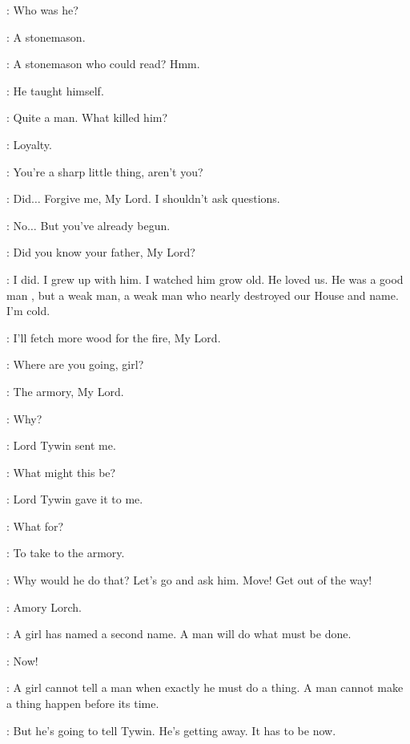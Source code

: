 \TYWIN: Who was he? 

\ARYA: A stonemason. 

\TYWIN: A stonemason who could read? Hmm. 

\ARYA: He taught himself. 

\TYWIN: Quite a man. What killed him? 

\ARYA: Loyalty. 

\TYWIN: You're a sharp little thing, aren't you? 

\ARYA: Did$\ldots$ Forgive me, My Lord. I shouldn't ask questions. 

\TYWIN: No$\ldots$ But you've already begun. 

\ARYA: Did you know your father, My Lord? 

\TYWIN: I did. I grew up with him. I watched him grow old. He loved us. He was a good man , but a weak man, a weak man who nearly destroyed our House and name. I'm cold. 

\ARYA: I'll fetch more wood for the fire, My Lord. 


\AMORY: Where are you going, girl? 

\ARYA: The armory, My Lord. 

\AMORY: Why? 

\ARYA: Lord Tywin sent me. 


\AMORY: What might this be? 

\ARYA: Lord Tywin gave it to me. 

\AMORY: What for? 

\ARYA: To take to the armory. 

\AMORY: Why would he do that? Let's go and ask him.   Move! Get out of the way! 


\ARYA: Amory Lorch. 

\JAQEN: A girl has named a second name. A man will do what must be done. 

\ARYA: Now! 

\JAQEN: A girl cannot tell a man when exactly he must do a thing. A man cannot make a thing happen before its time. 

\ARYA: But he's going to tell Tywin. He's getting away. It has to be now. 

